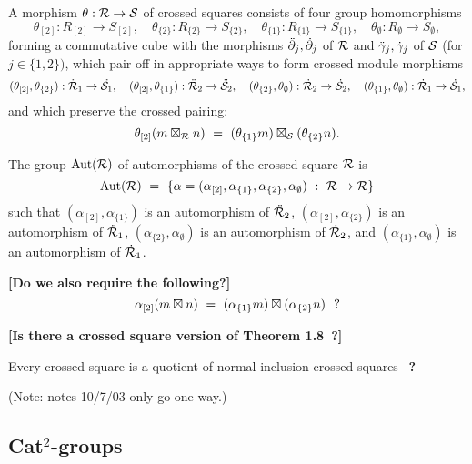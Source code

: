 \begin{defn}
A morphism $\theta : \mathcal{R} \to \mathcal{S}$ of crossed squares
consists of four group homomorphisms
$$
\theta_{[2]} : R_{[2]} \to S_{[2]}, \quad
\theta_{\{2\}} : R_{\{2\}} \to S_{\{2\}}, \quad
\theta_{\{1\}} : R_{\{1\}} \to S_{\{1\}}, \quad
\theta_{\emptyset} : R_{\emptyset} \to S_{\emptyset},
$$
forming a commutative cube with the morphisms 
$\ddot{\partial}_j, \dot{\partial}_j$ of $\mathcal{R}$
and $\ddot{\gamma}_j, \dot{\gamma}_j$ of $\mathcal{S}$ (for $j \in \{1,2\})$,
which pair off in appropriate ways to form crossed module morphisms
$$
(\theta_{[2]},\theta_{\{2\}}) : \ddot{\mathcal{R}}_1 \to \ddot{\mathcal{S}}_1, \quad
(\theta_{[2]},\theta_{\{1\}}) : \ddot{\mathcal{R}}_2 \to \ddot{\mathcal{S}}_2, \quad
(\theta_{\{2\}},\theta_{\emptyset}) : \dot{\mathcal{R}}_2 \to \dot{\mathcal{S}}_2, \quad
(\theta_{\{1\}},\theta_{\emptyset}) : \dot{\mathcal{R}}_1 \to \dot{\mathcal{S}}_1,
$$
and which preserve the crossed pairing: 
$$
\theta_{[2]}(m \boxtimes_{\mathcal{R}} n) ~=~ 
(\theta_{\{1\}} m) \boxtimes_{\mathcal{S}} (\theta_{\{2\}} n).
$$
\end{defn}

\begin{defn} \label{def:aut-xsq} 
The group $\mathrm{Aut}(\mathcal{R})$ of automorphisms of the crossed square $\mathcal{R}$ is 
$$
\mathrm{Aut}(\mathcal{R}) ~=~ \{ \alpha = 
(\alpha_{[2]}, \alpha_{\{1\}}, \alpha_{\{2\}}, \alpha_{\emptyset}) 
 ~:~ \mathcal{R} \to \mathcal{R} \}
$$ 
such that 
$(\alpha_{[2]}, \alpha_{\{1\}}) $  is an automorphism of  $\ddot{\mathcal{R}}_2$,
$(\alpha_{[2]}, \alpha_{\{2\}}) $  is an automorphism of  $\ddot{\mathcal{R}}_1$,
$(\alpha_{\{2\}}, \alpha_{\emptyset}) $  is an automorphism of  $\dot{\mathcal{R}}_2$, and 
$(\alpha_{\{1\}}, \alpha_{\emptyset}) $  is an automorphism of  $\dot{\mathcal{R}}_1$.
\end{defn}

\vspace*{15mm}
\noindent
{\bf [Do we also require the following?]}
$$
\alpha_{[2]}(m \boxtimes n) ~=~ (\alpha_{\{1\}} m) \boxtimes (\alpha_{\{2\}} n)
~~{\bf ?}
$$

\vspace*{15mm}
\noindent
{\bf [Is there a crossed square version of Theorem 1.8~?]}

\begin{thm}
Every crossed square is a quotient of normal inclusion crossed squares~ 
{\bf ?}
\end{thm}

\noindent
(Note: notes 10/7/03 only go one way.)


\newpage
\subsection{Cat$^2$-groups}  \label{subs:cattwo}

